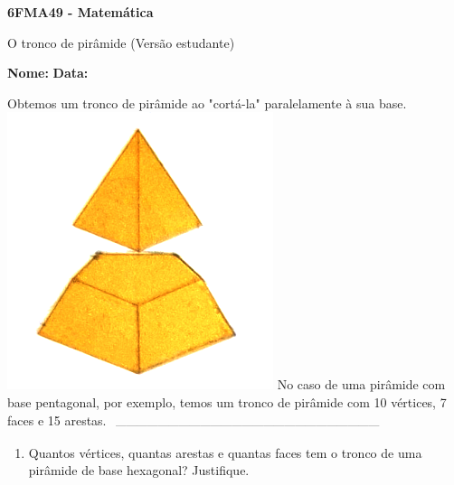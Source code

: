 \documentclass[a4paper,14pt]{article}
\begin{document}
	
	\noindent\textbf{6FMA49 - Matemática} 
	
	\begin{center}O tronco de pirâmide (Versão estudante)
	\end{center}
	
	\noindent\textbf{Nome:} \underline{\hspace{10cm}}
	\noindent\textbf{Data:} \underline{\hspace{4cm}}
	
	
	
    \begin{multicols}{2}
    	\noindent Obtemos um tronco de pirâmide ao "cortá-la" paralelamente à sua base.
    	\includegraphics[width=1\linewidth]{imagens_6FMA49/imagem1}
    	No caso de uma pirâmide com base pentagonal, por exemplo, temos um tronco de pirâmide com 10 vértices, 7 faces e 15 arestas.
    	\noindent\textsubscript{~---------------------------------------------------------------------------}
		\begin{enumerate}
			\item Quantos vértices, quantas arestas e quantas faces tem o tronco de uma pirâmide de base hexagonal? Justifique. \\\\\\\\\\\\\\\\\\

\end{enumerate}
\end{multicols}
\end{document}
